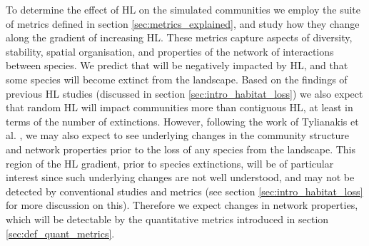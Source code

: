 To determine the effect of HL on the simulated communities we employ the suite of metrics defined in section \ref{sec:metrics_explained}, and study how they change along the gradient of increasing HL. These metrics capture aspects of diversity, stability, spatial organisation, and properties of the network of interactions between species. We predict that  will be negatively impacted by HL, and that  some species will become extinct from the landscape.  Based on the findings of previous HL studies (discussed in section \ref{sec:intro_habitat_loss}) we also expect that random HL will impact communities more than contiguous HL, at least in terms of the number of extinctions. However, following the work of Tylianakis et al. \cite{tylianakis2007habitat}, we may also expect to see underlying changes in the community structure and network properties prior to the loss of any species from the landscape. This region of the HL gradient, prior to species extinctions, will be of particular interest since such underlying changes are not well understood, and may not be detected by conventional studies and metrics (see section \ref{sec:intro_habitat_loss} for more discussion on this). Therefore we expect changes in network properties, which will be detectable  by the quantitative metrics introduced in section \ref{sec:def_quant_metrics}.   

